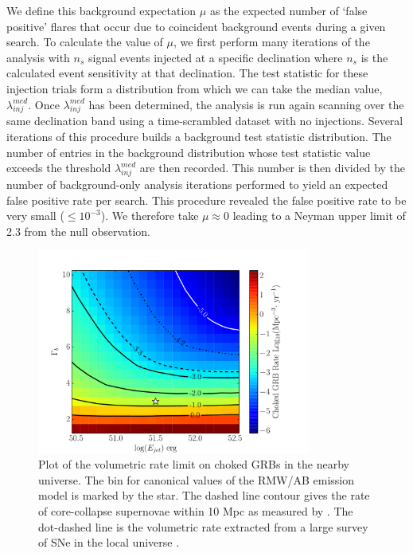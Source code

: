 \documentclass[manuscript]{aastex}
\begin{document}
We define this background expectation $\mu$ as the expected number of `false positive' flares that occur due to coincident background events during a given search. To calculate the value of $\mu$, we first perform many iterations of the analysis with $n_s$ signal events injected at a specific declination where $n_s$ is the calculated event sensitivity at that declination. The test statistic for these injection trials form a distribution from which we can take the median value, $\lambda_{inj}^{med}$. Once $\lambda_{inj}^{med}$ has been determined, the analysis is run again scanning over the same declination band using a time-scrambled dataset with no injections. Several iterations of this procedure builds a background test statistic distribution. The number of entries in the background distribution whose test statistic value exceeds the threshold $\lambda_{inj}^{med}$ are then recorded. This number is then divided by the number of background-only analysis iterations performed to yield an expected false positive rate per search. This procedure revealed the false positive rate to be very small ($\leq 10^{-3}$). We therefore take $\mu\approx0$ leading to a Neyman upper limit of 2.3 from the null observation.
\begin{figure}[ht]
  \begin{center}
    \includegraphics[width=0.8\textwidth,keepaspectratio]{plots/RateLimit_2DHisto_wContours_SysAdjusted.pdf}
  \end{center}
  \caption[Choked GRB Volumetric Rate Limit]{Plot of the volumetric rate limit on choked GRBs in the nearby universe. The bin for canonical values of the RMW/AB emission model is marked by the star. The dashed line contour gives the rate of core-collapse supernovae within 10 Mpc as measured by \cite{2011PhRvD..83l3008K}. The dot-dashed line is the volumetric rate extracted from a large survey of SNe in the local universe \citep{2011MNRAS.412.1419L}.}
  \label{fig:VolumetricRateSensitivity}
\end{figure}
\end{document}
